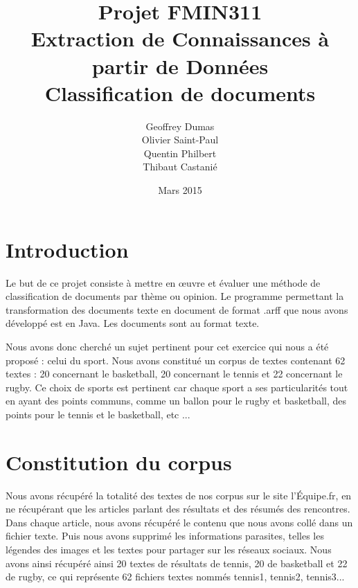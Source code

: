 \documentclass[a4paper,11pt]{article}
\begin{document}
\title{Projet FMIN311\\Extraction de Connaissances à partir de Données\\\textbf{Classification de documents}}
\author{Geoffrey Dumas\\Olivier Saint-Paul\\Quentin Philbert\\Thibaut Castanié}
\date{Mars 2015}

\maketitle
\thispagestyle{empty}

\newpage


\setcounter{page}{1}
\tableofcontents

\newpage

\section*{Introduction}
Le but de ce projet consiste à mettre en œuvre et évaluer une méthode de classification de documents par thème ou opinion. Le programme  permettant la transformation des documents texte en document de format .arff que nous avons développé est en Java. Les documents sont au format texte.

Nous avons donc cherché un sujet pertinent pour cet exercice qui nous a été proposé : celui du sport. Nous avons constitué un corpus de textes contenant 62 textes : 20 concernant le basketball, 20 concernant le tennis et 22 concernant le rugby. Ce choix de sports est pertinent car chaque sport a ses particularités tout en ayant des points communs, comme un ballon pour le rugby et basketball, des points pour le tennis et le basketball, etc ...

\newpage

\section{Constitution du corpus}
Nous avons récupéré la totalité des textes de nos corpus sur le site l’Équipe.fr, en ne récupérant que les articles parlant des résultats et des résumés des rencontres. Dans chaque article, nous avons récupéré le contenu que nous avons collé dans un fichier texte. Puis nous avons supprimé les informations parasites, telles les légendes des images et les textes pour partager sur les réseaux sociaux. Nous avons ainsi récupéré ainsi 20 textes de résultats de tennis, 20 de basketball et 22 de rugby, ce qui représente 62 fichiers textes nommés tennis1, tennis2, tennis3...
\end{document}

